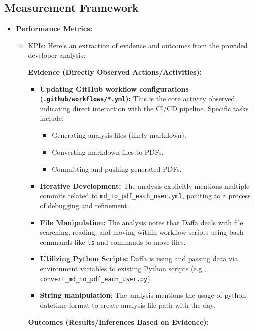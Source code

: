 \documentclass{article}
\begin{document}
\subsection{Measurement Framework}
\begin{itemize}
    \item \textbf{Performance Metrics:}
    \begin{itemize}
        \item KPIs: Here's an extraction of evidence and outcomes from the provided developer analysis:

        \textbf{Evidence (Directly Observed Actions/Activities):}

        \begin{itemize}
            \item \textbf{Updating GitHub workflow configurations (\texttt{.github/workflows/*.yml}):} This is the core activity observed, indicating direct interaction with the CI/CD pipeline.  Specific tasks include:
            \begin{itemize}
                \item Generating analysis files (likely markdown).
                \item Converting markdown files to PDFs.
                \item Committing and pushing generated PDFs.
            \end{itemize}
            \item \textbf{Iterative Development:} The analysis explicitly mentions multiple commits related to \texttt{md\_to\_pdf\_each\_user.yml}, pointing to a process of debugging and refinement.
            \item \textbf{File Manipulation:}  The analysis notes that Daffa deals with file searching, reading, and moving within workflow scripts using bash commands like \texttt{ls} and commands to move files.
            \item \textbf{Utilizing Python Scripts:} Daffa is using and passing data via environment variables to existing Python scripts (e.g., \texttt{convert\_md\_to\_pdf\_each\_user.py}).
            \item \textbf{String manipulation}: The analysis mentions the usage of python datetime format to create analysis file path with the day.
        \end{itemize}

        \textbf{Outcomes (Results/Inferences Based on Evidence):}


\end{itemize}
\end{itemize}
\end{document}
